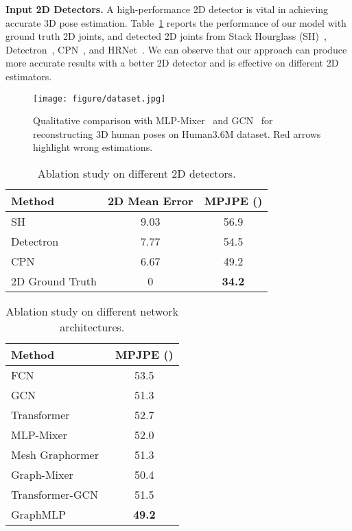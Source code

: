 \documentclass[lettersize,journal]{IEEEtran}
\begin{document}
\noindent \textbf{Input 2D Detectors.}
A high-performance 2D detector is vital in achieving accurate 3D pose estimation. 
Table~\ref{table:detectors} reports the performance of our model with ground truth 2D joints, and detected 2D joints from Stack Hourglass (SH)~\cite{newell2016stacked}, Detectron~\cite{videopose}, CPN~\cite{chen2018cascaded}, and HRNet~\cite{hrnet}. 
We can observe that our approach can produce more accurate results with a better 2D detector and is effective on different 2D estimators. 

\begin{figure*}[t]
  \centering
  \texttt{[image: figure/dataset.jpg]}
  \caption
  {
    Qualitative comparison with MLP-Mixer~\cite{mlpmixer} and GCN~\cite{stgcn} for reconstructing 3D human poses on Human3.6M dataset. 
    Red arrows highlight wrong estimations. 
  }
  \label{fig:dataset}
\end{figure*}

\begin{table}[t]
  \centering
  \caption
  {
    Ablation study on different 2D detectors. 
  }
  \setlength{\tabcolsep}{4.50mm}
  \begin{tabular}{lcc}
  \toprule
  Method &2D Mean Error &MPJPE ()  \\
  \midrule
  SH~\cite{newell2016stacked} &9.03 &56.9 \\ 
  Detectron~\cite{videopose} &7.77  &54.5 \\
  CPN~\cite{chen2018cascaded} &6.67 &49.2 \\

  2D Ground Truth &0 &\textbf{34.2} \\
  \toprule
  \end{tabular}
  \label{table:detectors}
\end{table}

\begin{table}[t]
  \centering
  \caption
  {
    Ablation study on different network architectures. 
  }
  \setlength{\tabcolsep}{7.30mm}
  \begin{tabular}{lc}
  \toprule
  Method &MPJPE ()  \\
  \midrule
  FCN~\cite{simplebaseline} &53.5 \\
  GCN~\cite{stgcn} &51.3 \\
  Transformer~\cite{transformer} &52.7 \\
  MLP-Mixer~\cite{mlpmixer} &52.0 \\
  Mesh Graphormer~\cite{meshgraphormer} &51.3 \\
  \midrule
  Graph-Mixer& 50.4 \\
  Transformer-GCN& 51.5 \\
  GraphMLP &\textbf{49.2} \\

  \toprule
  \end{tabular}
  \label{table:architecture}
\end{table}
\end{document}
